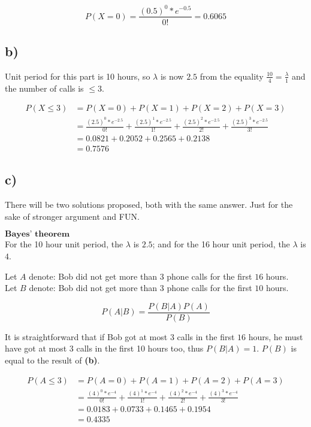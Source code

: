 \documentclass[12pt]{article}
\begin{document}
$$P(X = 0) = \frac{(0.5)^{0}*e^{-0.5}}{0!} = 0.6065$$

\vspace{1.5cm}

\subsection*{b)}

Unit period for this part is 10 hours, so $\lambda$ is now $2.5$ from the equality $\frac{10}{4} = \frac{\lambda}{1}$ and the number of calls is $\leq 3$.

\begin{align*}
P(X \leq 3) &= P(X = 0) + P(X = 1) + P(X = 2) + P(X = 3) \\
            &=  \frac{(2.5)^{0}*e^{-2.5}}{0!} + \frac{(2.5)^{1}*e^{-2.5}}{1!} + \frac{(2.5)^{2}*e^{-2.5}}{2!} + \frac{(2.5)^{3}*e^{-2.5}}{3!} \\
            &= 0.0821 + 0.2052 + 0.2565 + 0.2138 \\
            &= 0.7576
\end{align*}

\vspace{1.5cm}

\subsection*{c)}
There will be two solutions proposed, both with the same answer. Just for the sake of stronger argument and FUN. \\

\newpage


$\textbf{Bayes' theorem}$ \\

For the 10 hour unit period, the $\lambda$ is $2.5$; and for the 16 hour unit period, the $\lambda$ is $4$.
\begin{center}
    Let $A$ denote: Bob did not get more than $3$ phone calls for the first $16$ hours. \\
    Let $B$ denote: Bob did not get more than $3$ phone calls for the first $10$ hours.
\end{center}

$$P(A|B) = \frac{P(B|A)P(A)}{P(B)}$$

It is straightforward that if Bob got at most $3$ calls in the first $16$ hours, he must have got at most $3$ calls in the first 10 hours too, thus $P(B|A) = 1$. $P(B)$ is equal to the result of \textbf{(b)}.

\begin{align*}
P(A \leq 3) &= P(A = 0) + P(A = 1) + P(A = 2) + P(A = 3) \\
            &=  \frac{(4)^{0}*e^{-4}}{0!} + \frac{(4)^{1}*e^{-4}}{1!} + \frac{(4)^{2}*e^{-4}}{2!} + \frac{(4)^{3}*e^{-4}}{3!} \\
            &= 0.0183 + 0.0733 + 0.1465 + 0.1954 \\
            &= 0.4335
\end{align*}
\end{document}
